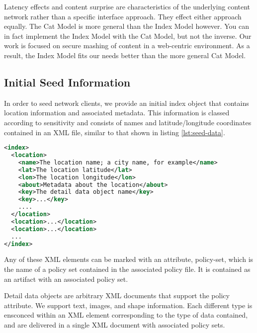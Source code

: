 Latency effects and content surprise are characteristics of the underlying content network rather than a specific interface approach.  They effect either approach equally.  The Cat Model is more general than the Index Model however.  You can in fact implement the Index Model with the Cat Model, but not the inverse.  Our work is focused on secure mashing of content in a web-centric environment.  As a result, the Index Model fits our needs better than the more general Cat Model.

\subsection{Initial Seed Information}
In order to seed network clients, we provide an initial index object that contains location information and associated metadata.  This information is classed according to sensitivity and consists of names and latitude/longitude coordinates contained in an XML file, similar to that shown in listing \ref{lst:seed-data}.

\begin{lstlisting}[language=xml, label=lst:seed-data, caption=Seed Information for the Network]
<index>
  <location>
    <name>The location name; a city name, for example</name>
    <lat>The location latitude</lat>
    <lon>The location longitude</lon>
    <about>Metadata about the location</about>
    <key>The detail data object name</key>
    <key>...</key>
    ....
  </location>
  <location>...</location>
  <location>...</location>
  ...
</index>
\end{lstlisting}

Any of these XML elements can be marked with an attribute, policy-set, which is the name of a policy set contained in the associated policy file.  It is contained as an artifact with an associated policy set.

Detail data objects are arbitrary XML documents that support the policy attribute.  We support text, images, and shape information.  Each different type is ensconced within an XML element corresponding to the type of data contained, and are delivered in a single XML document with associated policy sets.


